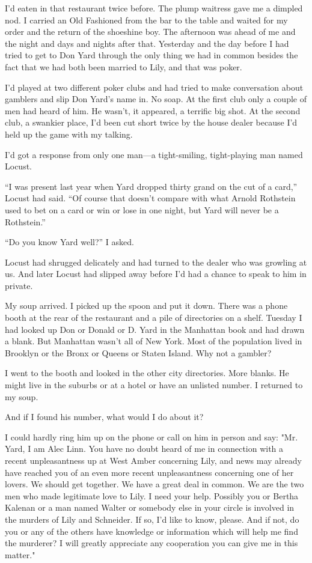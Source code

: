 \documentclass{novel}
\begin{document}
I’d eaten in that restaurant twice before. The plump waitress gave me a dimpled nod. I carried an Old Fashioned from the bar to the table and waited for my order and the return of the shoeshine boy. The afternoon was ahead of me and the night and days and nights after that. Yesterday and the day before I had tried to get to Don Yard through the only thing we had in common besides the fact that we had both been married to Lily, and that was poker. 

I’d played at two different poker clubs and had tried to make conversation about gamblers and slip Don Yard’s name in. No soap. At the first club only a couple of men had heard of him. He wasn’t, it appeared, a terrific big shot. At the second club, a swankier place, I’d been cut short twice by the house dealer because I’d held up the game with my talking.

I’d got a response from only one man—a tight-smiling, tight-playing man named Locust. 

“I was present last year when Yard dropped thirty grand on the cut of a card,” Locust had said. “Of course that doesn’t compare with what Arnold Rothstein used to bet on a card or win or lose in one night, but Yard will never be a Rothstein.”

“Do you know Yard well?” I asked.

Locust had shrugged delicately and had turned to the dealer who was growling at us. And later Locust had slipped away before I’d had a chance to speak to him in private.

My soup arrived. I picked up the spoon and put it down. There was a phone booth at the rear of the restaurant and a pile of directories on a shelf. Tuesday I had looked up Don or Donald or D. Yard in the Manhattan book and had drawn a blank. But Manhattan wasn’t all of New York. Most of the population lived in Brooklyn or the Bronx or Queens or Staten Island. Why not a gambler?

I went to the booth and looked in the other city directories. More blanks. He might live in the suburbs or at a hotel or have an unlisted number. I returned to my soup.

And if I found his number, what would I do about it?

I could hardly ring him up on the phone or call on him in person and say: "Mr. Yard, I am Alec Linn. You have no doubt heard of me in connection with a recent unpleasantness up at West Amber concerning Lily, and news may already have reached you of an even more recent unpleasantness concerning one of her lovers. We should get together. We have a great deal in common. We are the two men who made legitimate love to Lily. I need your help. Possibly you or Bertha Kalenan or a man named Walter or somebody else in your circle is involved in the murders of Lily and Schneider. If so, I’d like to know, please. And if not, do you or any of the others have knowledge or information which will help me find the murderer? I will greatly appreciate any cooperation you can give me in this matter."
\end{document}

